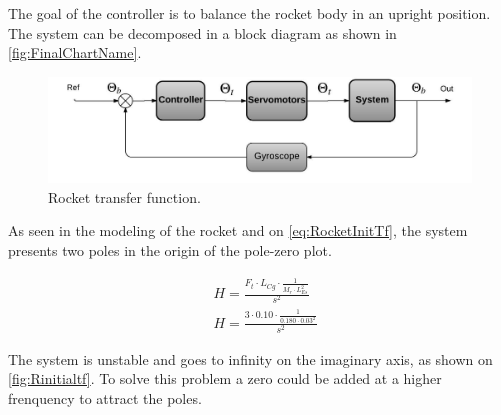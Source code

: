 \graphicspath{{figures/Rocket/design/}}

The goal of the controller is to balance the rocket body in an upright position. The system can be decomposed in a block diagram as shown in \autoref{fig:FinalChartName}.

\begin{figure}[htbp]
	\centering
	
	\includegraphics[width=\textwidth]{figures/Rocket/design/final_chart}
	\caption{Rocket transfer function.}
	\label{fig:FinalChartName}
	
\end{figure}

As seen in the modeling of the rocket and on \autoref{eq:RocketInitTf}, the system presents two poles in the origin of the pole-zero plot. 

\begin{subequations}
	\begin{flalign}
		& H = \frac{F_t \cdot L_{Cg} \cdot \frac{1}{M_r \cdot L_{Es}^2}}{s^2}	\label{eq:RocketInitTf} \\
		& H = \frac{3 \cdot 0.10 \cdot \frac{1}{0.180 \cdot 0.03^2}}{s^2}
	\end{flalign}
\end{subequations}
\startexplain
{}
\stopexplain

The system is unstable and goes to infinity on the imaginary axis, as shown on \autoref{fig:Rinitialtf}. To solve this problem a zero could be added at a higher frenquency to attract the poles.


